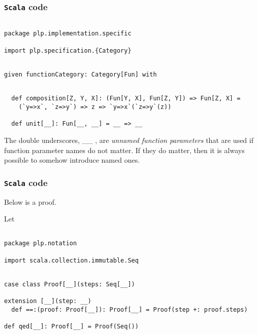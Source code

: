 \documentclass[11pt]{article}
\newcommand{\code}{\subsubsection{{\tt Scala} code}\begingroup\rm \vspace{12pt}}
\def\edefn{\endgroup\par\pagebreak[2]\addvspace{\medskipamount}}
\let\ecode=\edefn
\begin{document}
\code
\begin{mdframed}[backgroundcolor=lightgray!20] 
\begin{lstlisting}

package plp.implementation.specific

import plp.specification.{Category}
\end{lstlisting}
\end{mdframed}
\vspace{6pt}
\begin{mdframed}[backgroundcolor=lightgray!20] 
\begin{lstlisting}

given functionCategory: Category[Fun] with
\end{lstlisting}
\end{mdframed}
\vspace{6pt}
\begin{mdframed}[backgroundcolor=lightgray!20] 
\begin{lstlisting}

  def composition[Z, Y, X]: (Fun[Y, X], Fun[Z, Y]) => Fun[Z, X] =
    (`y=>x`, `z=>y`) => z => `y=>x`(`z=>y`(z))

  def unit[__]: Fun[__, __] = __ => __
\end{lstlisting}
\end{mdframed}
\ecode

The double underscores, {\_\_} , are {\em unnamed function parameters} that are used
if function parameter names do not matter. If they do matter, then it is always possible to somehow introduce named
ones.

\code
Below is a proof.

Let

\vspace{6pt}
\begin{mdframed}[backgroundcolor=lightgray!20] 
\begin{lstlisting}

package plp.notation

import scala.collection.immutable.Seq
\end{lstlisting}
\end{mdframed}
\vspace{6pt}
\begin{mdframed}[backgroundcolor=lightgray!20] 
\begin{lstlisting}

case class Proof[__](steps: Seq[__])

extension [__](step: __)
  def ==:(proof: Proof[__]): Proof[__] = Proof(step +: proof.steps)

def qed[__]: Proof[__] = Proof(Seq())
\end{lstlisting}
\end{mdframed}
\end{document}
